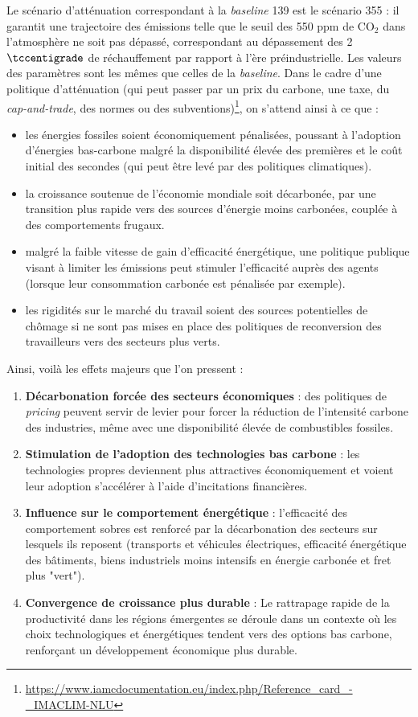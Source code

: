\documentclass[a4,11pt]{aleph-notas}
\begin{document}
Le scénario d'atténuation correspondant à la \textit{baseline} 139 est le scénario 355 : il garantit une trajectoire des émissions telle que le seuil des 550 ppm de CO$_2$ dans l'atmosphère ne soit pas dépassé, correspondant au dépassement des 2 $\tccentigrade$ de réchauffement par rapport à l'ère préindustrielle. Les valeurs des paramètres sont les mêmes que celles de la \textit{baseline}. Dans le cadre d'une politique d'atténuation (qui peut passer par un prix du carbone, une taxe, du \textit{cap-and-trade}, des normes ou des subventions)\footnote{\url{https://www.iamcdocumentation.eu/index.php/Reference_card_-_IMACLIM-NLU}}, on s'attend ainsi à ce que :
\begin{itemize}
    \item les énergies fossiles soient économiquement pénalisées, poussant à l'adoption d'énergies bas-carbone malgré la disponibilité élevée des premières et le coût initial des secondes (qui peut être levé par des politiques climatiques).
    \item la croissance soutenue de l'économie mondiale soit décarbonée, par une transition plus rapide vers des sources d'énergie moins carbonées, couplée à des comportements frugaux.
    \item malgré la faible vitesse de gain d'efficacité énergétique, une politique publique visant à limiter les émissions peut stimuler l'efficacité auprès des agents (lorsque leur consommation carbonée est pénalisée par exemple).
    \item les rigidités sur le marché du travail soient des sources potentielles de chômage si ne sont pas mises en place des politiques de reconversion des travailleurs vers des secteurs plus verts.
\end{itemize} 

Ainsi, voilà les effets majeurs que l'on pressent : 

\begin{enumerate}
    \item \textbf{Décarbonation forcée des secteurs économiques} : des politiques de \textit{pricing} peuvent servir de levier pour forcer la réduction de l’intensité carbone des industries, même avec une disponibilité élevée de combustibles fossiles.
    \item \textbf{Stimulation de l’adoption des technologies bas carbone} : les technologies propres deviennent plus attractives économiquement et voient leur adoption s’accélérer à l'aide d’incitations financières.
    \item \textbf{Influence sur le comportement énergétique} : l'efficacité des comportement sobres est renforcé par la décarbonation des secteurs sur lesquels ils reposent (transports et véhicules électriques, efficacité énergétique des bâtiments, biens industriels moins intensifs en énergie carbonée et fret plus "vert").
    \item \textbf{Convergence de croissance plus durable} : Le rattrapage rapide de la productivité dans les régions émergentes se déroule dans un contexte où les choix technologiques et énergétiques tendent vers des options bas carbone, renforçant un développement économique plus durable.
\end{enumerate}
\end{document}
